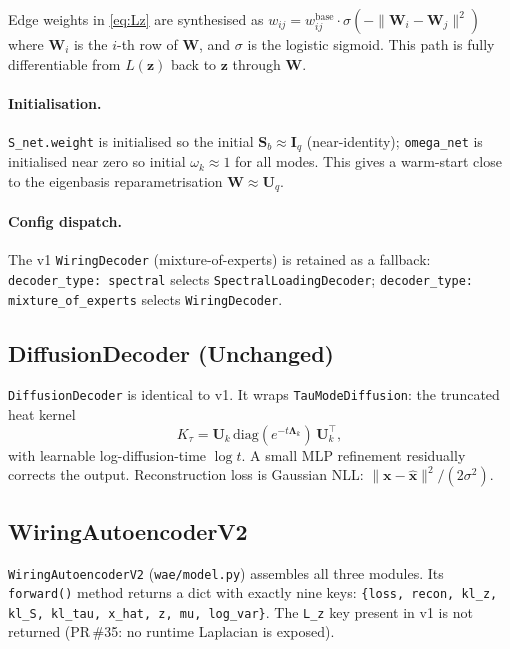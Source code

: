 \documentclass[11pt,a4paper]{article}
\newcommand{\diag}{\mathrm{diag}}
\newcommand{\bLambda}{\bm{\Lambda}}
\newcommand{\bU}{\bm{U}}
\newcommand{\bS}{\bm{S}}
\newcommand{\bW}{\bm{W}}
\newcommand{\bz}{\bm{z}}
\newcommand{\bx}{\bm{x}}
\begin{document}
Edge weights in \eqref{eq:Lz} are synthesised as
$w_{ij} = w_{ij}^{\mathrm{base}}\cdot\sigma(-\|\bW_i-\bW_j\|^2)$ where
$\bW_i$ is the $i$-th row of $\bW$, and $\sigma$ is the logistic sigmoid.
This path is fully differentiable from $L(\bz)$ back to $\bz$ through $\bW$.

\paragraph{Initialisation.}
\texttt{S\_net.weight} is initialised so the initial $\bS_b\approx\bm{I}_q$
(near-identity); \texttt{omega\_net} is initialised near zero so initial
$\omega_k\approx 1$ for all modes.  This gives a warm-start close to the
eigenbasis reparametrisation $\bW\approx\bU_q$.

\paragraph{Config dispatch.}
The v1 \texttt{WiringDecoder} (mixture-of-experts) is retained as a
fallback: \texttt{decoder\_type: spectral} selects
\texttt{SpectralLoadingDecoder}; \texttt{decoder\_type: mixture\_of\_experts}
selects \texttt{WiringDecoder}.

\subsection{DiffusionDecoder (Unchanged)}

\texttt{DiffusionDecoder} is identical to v1.  It wraps
\texttt{TauModeDiffusion}: the truncated heat kernel
\begin{equation}
  K_\tau = \bU_k\,\diag(e^{-t\bLambda_k})\,\bU_k^\top,
  \label{eq:heat_kernel}
\end{equation}
with learnable log-diffusion-time $\log t$.  A small MLP refinement
residually corrects the output.  Reconstruction loss is Gaussian NLL:
$\|\bx-\hat{\bx}\|^2/(2\sigma^2)$.

\subsection{WiringAutoencoderV2}

\texttt{WiringAutoencoderV2} (\texttt{wae/model.py}) assembles all three
modules.  Its \texttt{forward()} method returns a dict with exactly nine keys:
\texttt{\{loss, recon, kl\_z, kl\_S, kl\_tau, x\_hat, z, mu, log\_var\}}.
The \texttt{L\_z} key present in v1 is not returned (PR\,\#35: no runtime
Laplacian is exposed).
\end{document}
